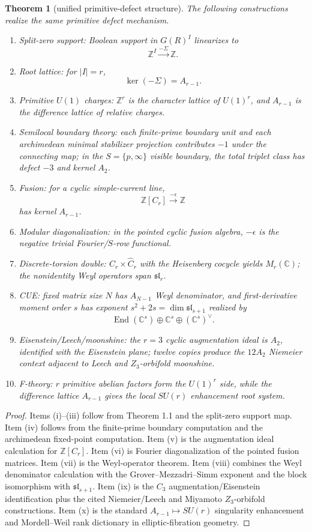 \documentclass[11pt]{article}
\newtheorem{theorem}{Theorem}[section]
\theoremstyle{remark}
\DeclareMathOperator{\End}{End}
\newcommand{\ZZ}{\mathbb Z}
\newcommand{\CC}{\mathbb C}
\begin{document}
\begin{theorem}[unified primitive-defect structure]
The following constructions realize the same primitive defect mechanism.
\begin{enumerate}[label=(\roman*)]
\item Split-zero support: Boolean support in $G(R)^I$ linearizes to
\[
        \ZZ^I\xrightarrow{-\Sigma}\ZZ.
\]
\item Root lattice: for $|I|=r$,
\[
        \ker(-\Sigma)=A_{r-1}.
\]
\item Primitive $U(1)$ charges: $\ZZ^r$ is the character lattice of $U(1)^r$, and $A_{r-1}$ is the difference lattice of relative charges.
\item Semilocal boundary theory: each finite-prime boundary unit and each archimedean minimal stabilizer projection contributes $-1$ under the connecting map; in the $S=\{p,\infty\}$ visible boundary, the total triplet class has defect $-3$ and kernel $A_2$.
\item Fusion: for a cyclic simple-current line,
\[
        \ZZ[C_r]\xrightarrow{-\epsilon}\ZZ
\]
has kernel $A_{r-1}$.
\item Modular diagonalization: in the pointed cyclic fusion algebra, $-\epsilon$ is the negative trivial Fourier/$S$-row functional.
\item Discrete-torsion double: $C_r\times\widehat C_r$ with the Heisenberg cocycle yields $M_r(\CC)$; the nonidentity Weyl operators span $\mathfrak{sl}_r$.
\item CUE: fixed matrix size $N$ has $A_{N-1}$ Weyl denominator, and first-derivative moment order $s$ has exponent $s^2+2s=\dim\mathfrak{sl}_{s+1}$ realized by
\[
        \End(\CC^s)\oplus\CC^s\oplus(\CC^s)^\vee.
\]
\item Eisenstein/Leech/moonshine: the $r=3$ cyclic augmentation ideal is $A_2$, identified with the Eisenstein plane; twelve copies produce the $12A_2$ Niemeier context adjacent to Leech and $Z_3$-orbifold moonshine.
\item F-theory: $r$ primitive abelian factors form the $U(1)^r$ side, while the difference lattice $A_{r-1}$ gives the local $SU(r)$ enhancement root system.
\end{enumerate}
\end{theorem}

\begin{proof}
Items (i)--(iii) follow from Theorem 1.1 and the split-zero support map.  Item (iv) follows from the finite-prime boundary computation and the archimedean fixed-point computation.  Item (v) is the augmentation ideal calculation for $\ZZ[C_r]$.  Item (vi) is Fourier diagonalization of the pointed fusion matrices.  Item (vii) is the Weyl-operator theorem.  Item (viii) combines the Weyl denominator calculation with the Grover--Mezzadri--Simm exponent and the block isomorphism with $\mathfrak{sl}_{s+1}$.  Item (ix) is the $C_3$ augmentation/Eisenstein identification plus the cited Niemeier/Leech and Miyamoto $Z_3$-orbifold constructions.  Item (x) is the standard $A_{r-1}\mapsto SU(r)$ singularity enhancement and Mordell--Weil rank dictionary in elliptic-fibration geometry.\end{proof}
\end{document}
